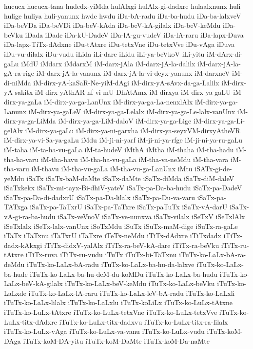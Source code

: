 {hucucx
hucucx-tana
hudedx-yiMda
hulAlxgi
hulAlx-gi-dadxre
hulaalxnunx
huli
hulige
huliya
huli-yanunx
hwde
hwdu
iDa-bA-radu
iDa-ba-hudu
iDa-ba-lalxveV
iDa-beVDa
iDa-beVDi
iDa-beV-kAda
iDa-beV-kA-gilalx
iDa-beV-keMdu
iDa-beVku
iDada
iDade
iDa-kU-DadeV
iDa-lA-gu-vudeV
iDa-lA-raru
iDa-lapx-Duva
iDa-lapx-TiTx-dAdxne
iDu-tAtxre
iDu-tetxVne
iDu-tetxVve
iDu-vAga
iDuva
iDu-vu-dilalx
iDu-vudu
iLida
iLi-dare
iLidu
iLi-ya-beVkoV
iLi-yitu
iM-dArx-di-gaLu
iMdU
iMdarx
iMdarxM
iM-darx-jAla
iM-darx-jA-la-dalilx
iM-darx-jA-la-gA-ra-rige
iM-darx-jA-la-vanunx
iM-darx-jA-la-vi-deyx-yanunx
iM-darxneV
iM-di-niMda
iM-dirx-yA-kaSaR-Ne-yiM-dAgi
iM-dirx-yA-sAvx-da-ga-Lalilx
iM-dirx-yA-sakitx
iM-dirx-yAthAR-nf-vi-mU-DhAtAmx
iM-dirxya
iM-dirx-ya-gaLU
iM-dirx-ya-gaLa
iM-dirx-ya-ga-LanUnx
iM-dirx-ya-ga-La-nenxlAlx
iM-dirx-ya-ga-Lanunx
iM-dirx-ya-gaLeV
iM-dirx-ya-ga-Lelalx
iM-dirx-ya-ga-Le-lalx-vanUnx
iM-dirx-ya-ga-LiMda
iM-dirx-ya-ga-LiM-daloV
iM-dirx-ya-ga-Lige
iM-dirx-ya-ga-Li-gelAlx
iM-dirx-ya-gaLu
iM-dirx-ya-ni-garxha
iM-dirx-ya-seyxVM-dirxyAtheVR
iM-dirx-ya-vi-Sa-ya-gaLu
iMdu
iM-ji-ni-yarf
iM-ji-ni-ya-rfge
iM-ji-ni-ya-ru-gaLu
iM-taha
iM-ta-ha-vu-gaLa
iM-ta-hudeV
iMthA
iMtha
iM-thaha
iM-tha-hadu
iM-tha-ha-varu
iM-tha-havu
iM-tha-ha-vu-gaLa
iM-tha-va-neMdu
iM-tha-vara
iM-tha-varu
iM-thavu
iM-tha-vu-gaLa
iM-tha-vu-ga-LanUnx
iMtu
iSATx-gi-de-yeMdu
iSaTx
iSaTx-baM-daMte
iSaTx-daMte
iSaTx-diMda
iSaTx-diM-daleV
iSaTxkekx
iSaTx-mi-tayx-Bi-dhiV-yateV
iSaTx-pa-Da-ba-hudu
iSaTx-pa-DadeV
iSaTx-pa-Da-di-dadxrU
iSaTx-pa-Da-lilalx
iSaTx-pa-Du-va-varu
iSaTx-pa-TATxga
iSaTx-pa-TaTxrU
iSaTx-pa-TaTxre
iSaTx-paTuTx
iSaTx-vA-darU
iSaTx-vA-gi-ra-ba-hudu
iSaTx-veVnoV
iSaTx-ve-nunxva
iSaTx-vilalx
iSeTxV
iSeTxlAlx
iSeTxlalx
iSeTx-lalx-vanUnx
iSoTxMdu
iSuTx
iSuTx-maM-dige
iSuTx-ra-gaLe
iTaTx
iTaTxnu
iTaTxrU
iTaTxre
iTeTx-neMdu
iTiTx-dAdxre
iTiTxdadx
iTiTx-dadx-kAkxgi
iTiTx-didxV-yalAlx
iTiTx-ra-beV-kA-dare
iTiTx-ra-beVku
iTiTx-ru-tAtxre
iTiTx-ruva
iTiTx-ru-vudu
iTuTx
iTuTx-bi-TaTxnu
iTuTx-ko-LaLx-bA-ra-deMdu
iTuTx-ko-LaLx-bA-radu
iTuTx-ko-LaLx-ba-hu-da-lalxve
iTuTx-ko-LaLx-ba-hude
iTuTx-ko-LaLx-ba-hu-deM-du-koMDu
iTuTx-ko-LaLx-ba-hudu
iTuTx-ko-LaLx-beV-kA-gilalx
iTuTx-ko-LaLx-beV-keMdu
iTuTx-ko-LaLx-beVku
iTuTx-ko-LaLxde
iTuTx-ko-LaLx-lA-raru
iTuTx-ko-LaLx-leV-bA-radu
iTuTx-ko-LaLxli
iTuTx-ko-LaLx-lilalx
iTuTx-ko-LaLxlu
iTuTx-koLiLx
iTuTx-ko-LuLx-tAtxne
iTuTx-ko-LuLx-tAtxre
iTuTx-ko-LuLx-tetxVne
iTuTx-ko-LuLx-tetxVve
iTuTx-ko-LuLx-titx-dAdxre
iTuTx-ko-LuLx-titx-dadxvu
iTuTx-ko-LuLx-titx-ra-lilalx
iTuTx-ko-LuLx-vAga
iTuTx-ko-LuLx-va-vanu
iTuTx-ko-LuLx-vudu
iTuTx-koM-DAga
iTuTx-koM-DA-yitu
iTuTx-koM-DaMte
iTuTx-koM-Da-naMte
}
